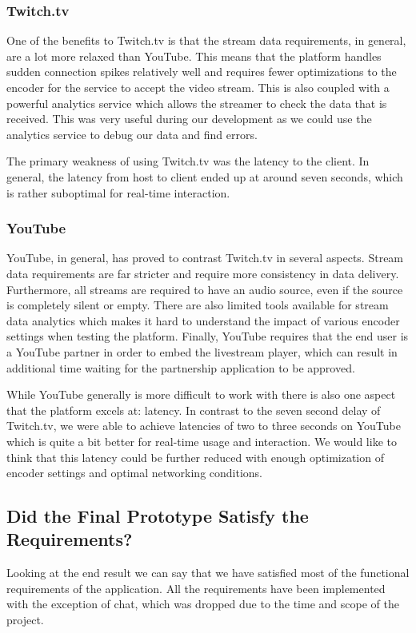 \subsubsection{Twitch.tv}
One of the benefits to Twitch.tv is that the stream data requirements, in general, are a lot more relaxed than YouTube. This means that the platform handles sudden connection spikes relatively well and requires fewer optimizations to the encoder for the service to accept the video stream. This is also coupled with a powerful analytics service which allows the streamer to check the data that is received. This was very useful during our development as we could use the analytics service to debug our data and find errors.

The primary weakness of using Twitch.tv was the latency to the client. In general, the latency from host to client ended up at around seven seconds, which is rather suboptimal for real-time interaction. 

\subsubsection{YouTube}
YouTube, in general, has proved to contrast Twitch.tv in several aspects. Stream data requirements are far stricter and require more consistency in data delivery. Furthermore, all streams are required to have an audio source, even if the source is completely silent or empty. There are also limited tools available for stream data analytics which makes it hard to understand the impact of various encoder settings when testing the platform. Finally, YouTube requires that the end user is a YouTube partner in order to embed the livestream player, which can result in additional time waiting for the partnership application to be approved. 

While YouTube generally is more difficult to work with there is also one aspect that the platform excels at: latency. In contrast to the seven second delay of Twitch.tv, we were able to achieve latencies of two to three seconds on YouTube which is quite a bit better for real-time usage and interaction. We would like to think that this latency could be further reduced with enough optimization of encoder settings and optimal networking conditions.

\subsection{Did the Final Prototype Satisfy the Requirements?}
Looking at the end result we can say that we have satisfied most of the functional requirements of the application. All the requirements have been implemented with the exception of chat, which was dropped due to the time and scope of the project. 


